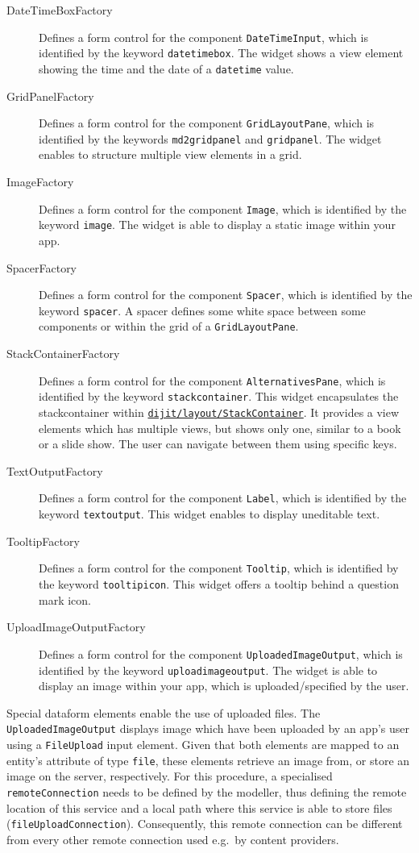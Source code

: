 \begin{description}
	\item[DateTimeBoxFactory] Defines a form control for the component \lstinline|DateTimeInput|, which is identified by the keyword \lstinline|datetimebox|. The widget shows a view element showing the time and the date of a \lstinline|datetime| value.
	\item[GridPanelFactory] Defines a form control for the component \lstinline|GridLayoutPane|, which is identified by the keywords \lstinline|md2gridpanel| and \lstinline|gridpanel|. The widget enables to structure multiple view elements in a grid.
	\item[ImageFactory] Defines a form control for the component \lstinline|Image|, which is identified by the keyword \lstinline|image|. The widget is able to display a static image within your app.
	\item[SpacerFactory] Defines a form control for the component \lstinline|Spacer|, which is identified by the keyword \lstinline|spacer|. A spacer defines some white space between some components or within the grid of a \lstinline|GridLayoutPane|.
	\item[StackContainerFactory] Defines a form control for the component \lstinline|AlternativesPane|, which is identified by the keyword \lstinline|stackcontainer|. This widget encapsulates the stackcontainer within \href{http://dojotoolkit.org/reference-guide/1.10/dijit/layout/StackContainer.html}{\lstinline|dijit/layout/StackContainer|}. It provides a view elements which has multiple views, but shows only one, similar to a book or a slide show. The user can navigate between them using specific keys. 
	\item[TextOutputFactory] Defines a form control for the component \lstinline|Label|, which is identified by the keyword \lstinline|textoutput|. This widget enables to display uneditable text.
	\item[TooltipFactory] Defines a form control for the component \lstinline|Tooltip|, which is identified by the keyword \lstinline|tooltipicon|. This widget offers a tooltip behind a question mark icon.
	\item[UploadImageOutputFactory] Defines a form control for the component \lstinline|UploadedImageOutput|, which is identified by the keyword \lstinline|uploadimageoutput|. The widget is able to display an image within your app, which is uploaded/specified by the user. 
\end{description}

Special dataform elements enable the use of uploaded files. The \lstinline|UploadedImageOutput| displays image which have been uploaded by an app's user using a \lstinline|FileUpload| input element. Given that both elements are mapped to an entity's attribute of type \lstinline|file|, these elements retrieve an image from, or store an image on the server, respectively. For this procedure, a specialised \lstinline|remoteConnection| needs to be defined by the modeller, thus defining the remote location of this service and a local path where this service is able to store files (\lstinline|fileUploadConnection|). Consequently, this remote connection can be different from every other remote connection used e.g.\ by content providers.


